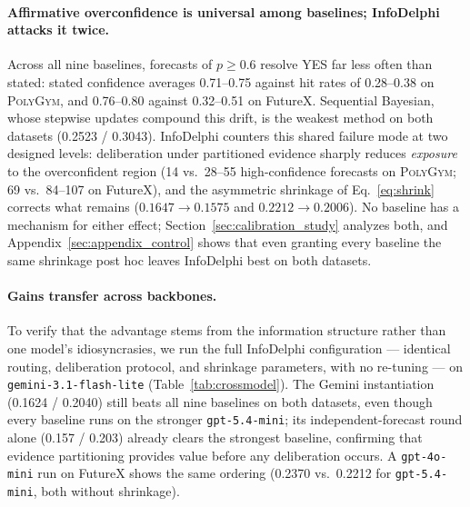 \paragraph{ Affirmative overconfidence is universal among baselines; InfoDelphi attacks it twice.}
Across all nine baselines, forecasts of $p \geq 0.6$ resolve YES far less often than stated: stated confidence averages 0.71--0.75 against hit rates of 0.28--0.38 on \textsc{PolyGym}, and 0.76--0.80 against 0.32--0.51 on FutureX.
Sequential Bayesian, whose stepwise updates compound this drift, is the weakest method on both datasets (0.2523 / 0.3043).
InfoDelphi counters this shared failure mode at two designed levels: deliberation under partitioned evidence sharply reduces \emph{exposure} to the overconfident region (14 vs.\ 28--55 high-confidence forecasts on \textsc{PolyGym}; 69 vs.\ 84--107 on FutureX), and the asymmetric shrinkage of Eq.~\eqref{eq:shrink} corrects what remains ($0.1647 \to 0.1575$ and $0.2212 \to 0.2006$).
No baseline has a mechanism for either effect; Section~\ref{sec:calibration_study} analyzes both, and Appendix~\ref{sec:appendix_control} shows that even granting every baseline the same shrinkage post hoc leaves InfoDelphi best on both datasets.



\paragraph{ Gains transfer across backbones.}
To verify that the advantage stems from the information structure rather than one model's idiosyncrasies, we run the full InfoDelphi configuration --- identical routing, deliberation protocol, and shrinkage parameters, with no re-tuning --- on \texttt{gemini-3.1-flash-lite} (Table~\ref{tab:crossmodel}).
The Gemini instantiation (0.1624 / 0.2040) still beats all nine baselines on both datasets, even though every baseline runs on the stronger \texttt{gpt-5.4-mini}; its independent-forecast round alone (0.157 / 0.203) already clears the strongest baseline, confirming that evidence partitioning provides value before any deliberation occurs.
A \texttt{gpt-4o-mini} run on FutureX shows the same ordering (0.2370 vs.\ 0.2212 for \texttt{gpt-5.4-mini}, both without shrinkage).
